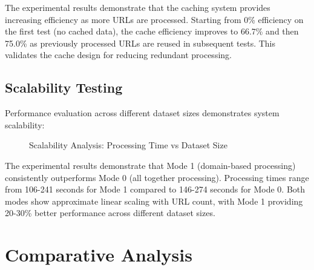 The experimental results demonstrate that the caching system provides increasing efficiency as more URLs are processed. Starting from 0\% efficiency on the first test (no cached data), the cache efficiency improves to 66.7\% and then 75.0\% as previously processed URLs are reused in subsequent tests. This validates the cache design for reducing redundant processing.

\subsection{Scalability Testing}

Performance evaluation across different dataset sizes demonstrates system scalability:

\begin{figure}[h]
\centering
{}
\caption{Scalability Analysis: Processing Time vs Dataset Size}
\label{fig:scalability_analysis}
\end{figure}

The experimental results demonstrate that Mode 1 (domain-based processing) consistently outperforms Mode 0 (all together processing). Processing times range from 106-241 seconds for Mode 1 compared to 146-274 seconds for Mode 0. Both modes show approximate linear scaling with URL count, with Mode 1 providing 20-30\% better performance across different dataset sizes.



\section{Comparative Analysis}
\label{sec:comparative_analysis}

